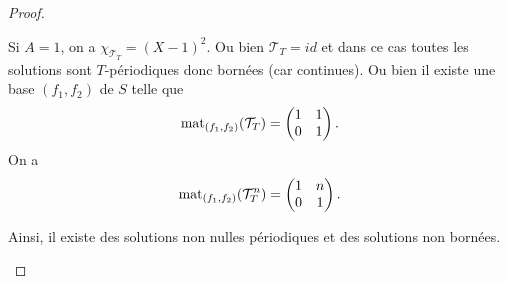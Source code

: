 \documentclass[12pt]{article}
\begin{document}
\begin{proof}
\begin{enumerate}
		Si $A=1$, on a $\chi_{\mathcal{T}_{T}}=(X-1)^{2}$. Ou bien $\mathcal{T}_{T}=id$ et dans ce cas toutes les solutions sont $T$-périodiques donc bornées (car continues). Ou bien il existe une base $(f_1,f_2)$ de $S$ telle que 
		\begin{equation*}
			\operatorname{mat}_{(f_1,f_2)}(\mathcal{T}_{T})=\begin{pmatrix}
				1&1\\
				0&1
			\end{pmatrix}.
		\end{equation*}
		On a 
		\begin{equation*}
			\operatorname{mat}_{(f_1,f_2)}(\mathcal{T}_{T}^{n})=\begin{pmatrix}
				1&n\\0&1
			\end{pmatrix}.
		\end{equation*}

		Ainsi, il existe des solutions non nulles périodiques et des solutions non bornées.
	\end{enumerate}
\end{proof}
\end{document}
